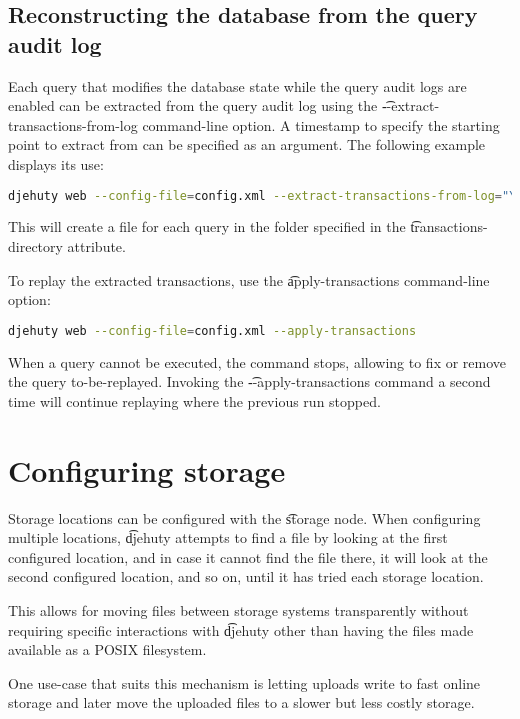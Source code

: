 \subsection{Reconstructing the database from the query audit log}

  Each query that modifies the database state while the query audit logs
  are enabled can be extracted from the query audit log using the
  \t{-{}-extract-transactions-from-log} command-line option.  A timestamp to
  specify the starting point to extract from can be specified as an argument.
  The following example displays its use:

\begin{lstlisting}[language=bash]
djehuty web --config-file=config.xml --extract-transactions-from-log="YYYY-MM-DD HH:MM:SS"
\end{lstlisting}

This will create a file for each query in the folder specified in the
\t{transactions-directory} attribute.

  To replay the extracted transactions, use the \t{apply-transactions}
  command-line option:
\begin{lstlisting}[language=bash]
djehuty web --config-file=config.xml --apply-transactions
\end{lstlisting}

  When a query cannot be executed, the command stops, allowing to fix or
  remove the query to-be-replayed.  Invoking the \t{-{}-apply-transactions}
  command a second time will continue replaying where the previous run stopped.

\section{Configuring storage}

  Storage locations can be configured with the \t{storage} node.
  When configuring multiple locations, \t{djehuty} attempts to find a
  file by looking at the first configured location, and in case it cannot
  find the file there, it will look at the second configured location,
  and so on, until it has tried each storage location.

  This allows for moving files between storage systems transparently
  without requiring specific interactions with \t{djehuty} other than
  having the files made available as a POSIX filesystem.

  One use-case that suits this mechanism is letting uploads write to
  fast online storage and later move the uploaded files to a slower but
  less costly storage.

